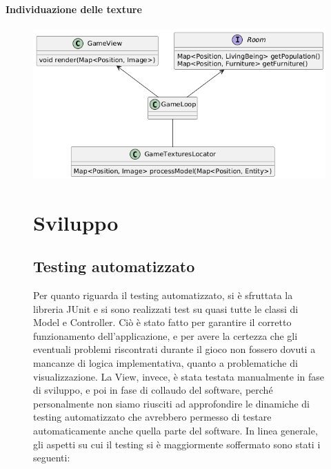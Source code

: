 \documentclass[a4paper,12pt]{report}
\begin{document}
\subsubsection{Individuazione delle texture}
\begin{figure}[H]
	\centering
	\includegraphics[width=\textwidth]{img/locator-game.png}

\chapter{Sviluppo}

\section{Testing automatizzato}

Per quanto riguarda il testing automatizzato, si è sfruttata la libreria JUnit e si sono realizzati test su quasi tutte le classi di Model e Controller. Ciò è stato fatto per garantire il corretto funzionamento dell’applicazione, e per avere la certezza che gli eventuali problemi riscontrati durante il gioco non fossero dovuti a mancanze di logica implementativa, quanto a problematiche di visualizzazione. 
%
\newline La View, invece, è stata testata manualmente in fase di sviluppo, e poi in fase di collaudo del software, perché personalmente non siamo riusciti ad approfondire le dinamiche di testing automatizzato che avrebbero permesso di testare automaticamente anche quella parte del software.
%
\newline In linea generale, gli aspetti su cui il testing si è maggiormente soffermato sono stati i seguenti:


\end{figure}
\end{document}
